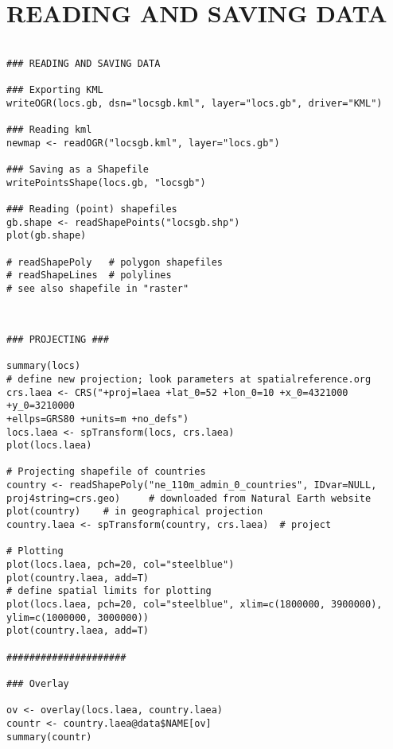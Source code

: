 \documentclass[11pt]{article} %
\begin{document}
\section{READING AND SAVING DATA}
\begin{framed}
\begin{verbatim}
  
### READING AND SAVING DATA
 
### Exporting KML
writeOGR(locs.gb, dsn="locsgb.kml", layer="locs.gb", driver="KML")
 
### Reading kml
newmap <- readOGR("locsgb.kml", layer="locs.gb")
 
### Saving as a Shapefile
writePointsShape(locs.gb, "locsgb")
 
### Reading (point) shapefiles
gb.shape <- readShapePoints("locsgb.shp")
plot(gb.shape)
 
# readShapePoly   # polygon shapefiles
# readShapeLines  # polylines
# see also shapefile in "raster"
 
 \end{verbatim}
\end{framed}

\newpage
\begin{verbatim} 
 
### PROJECTING ###
 
summary(locs)
# define new projection; look parameters at spatialreference.org
crs.laea <- CRS("+proj=laea +lat_0=52 +lon_0=10 +x_0=4321000 +y_0=3210000
+ellps=GRS80 +units=m +no_defs")
locs.laea <- spTransform(locs, crs.laea)
plot(locs.laea)
 
# Projecting shapefile of countries
country <- readShapePoly("ne_110m_admin_0_countries", IDvar=NULL,
proj4string=crs.geo)     # downloaded from Natural Earth website
plot(country)    # in geographical projection
country.laea <- spTransform(country, crs.laea)  # project
 
# Plotting
plot(locs.laea, pch=20, col="steelblue")
plot(country.laea, add=T)
# define spatial limits for plotting
plot(locs.laea, pch=20, col="steelblue", xlim=c(1800000, 3900000),
ylim=c(1000000, 3000000))
plot(country.laea, add=T)
 
#####################
 
### Overlay
 
ov <- overlay(locs.laea, country.laea)
countr <- country.laea@data$NAME[ov]
summary(countr)
 
 \end{verbatim}
 
\newpage
\end{document}
